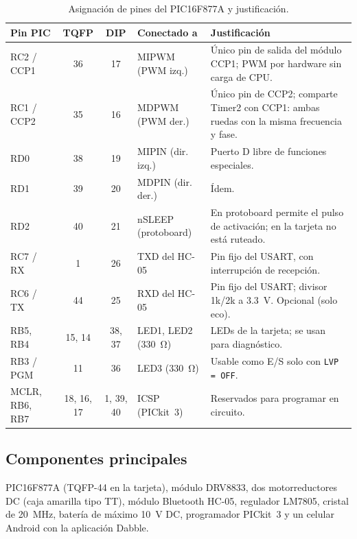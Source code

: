 \begin{table}[H]
  \centering
  \caption{Asignación de pines del PIC16F877A y justificación.}
  \label{tab:pines}
  \small
  \begin{tabularx}{\textwidth}{@{}l c c l L@{}}
    \toprule
    \textbf{Pin PIC} & \textbf{TQFP} & \textbf{DIP} & \textbf{Conectado a} & \textbf{Justificación} \\
    \midrule
    RC2 / CCP1 & 36 & 17 & MIPWM (PWM izq.) & Único pin de salida del módulo CCP1; PWM por hardware sin carga de CPU. \\
    RC1 / CCP2 & 35 & 16 & MDPWM (PWM der.) & Único pin de CCP2; comparte Timer2 con CCP1: ambas ruedas con la misma frecuencia y fase. \\
    RD0        & 38 & 19 & MIPIN (dir. izq.) & Puerto D libre de funciones especiales. \\
    RD1        & 39 & 20 & MDPIN (dir. der.) & Ídem. \\
    RD2        & 40 & 21 & nSLEEP (protoboard) & En protoboard permite el pulso de activación; en la tarjeta no está ruteado. \\
    RC7 / RX   & 1  & 26 & TXD del HC-05 & Pin fijo del USART, con interrupción de recepción. \\
    RC6 / TX   & 44 & 25 & RXD del HC-05 & Pin fijo del USART; divisor 1k/2k a \SI{3.3}{\volt}. Opcional (solo eco). \\
    RB5, RB4   & 15, 14 & 38, 37 & LED1, LED2 (\SI{330}{\ohm}) & LEDs de la tarjeta; se usan para diagnóstico. \\
    RB3 / PGM  & 11 & 36 & LED3 (\SI{330}{\ohm}) & Usable como E/S solo con \texttt{LVP = OFF}. \\
    MCLR, RB6, RB7 & 18, 16, 17 & 1, 39, 40 & ICSP (PICkit~3) & Reservados para programar en circuito. \\
    \bottomrule
  \end{tabularx}
\end{table}

\subsection{Componentes principales}

PIC16F877A (TQFP-44 en la tarjeta), módulo DRV8833, dos motorreductores DC
(caja amarilla tipo TT), módulo Bluetooth HC-05, regulador LM7805, cristal de
\SI{20}{\mega\hertz}, batería de máximo \SI{10}{\volt} DC, programador PICkit~3
y un celular Android con la aplicación Dabble.
